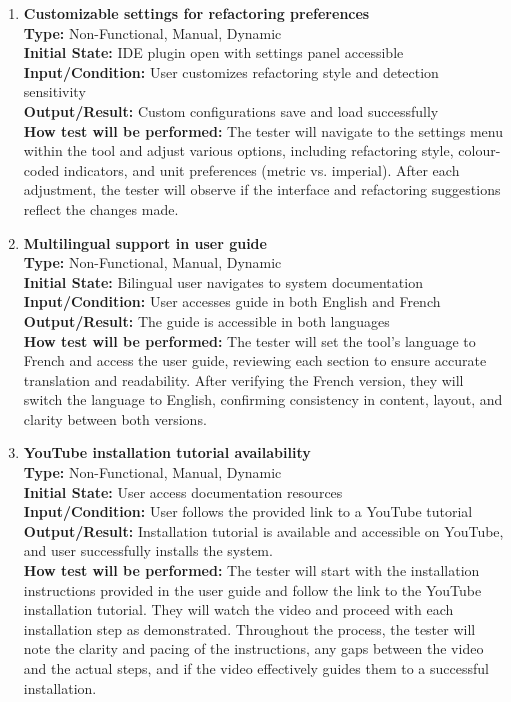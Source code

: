 \documentclass[12pt, titlepage]{article}
\begin{document}
\begin{enumerate}[label={\bf \textcolor{Maroon}{test-UH-\arabic*}}, wide=0pt, font=\itshape]
  \item \textbf{Customizable settings for refactoring preferences} \\[2mm]
    \textbf{Type:} Non-Functional, Manual, Dynamic \\
    \textbf{Initial State:} IDE plugin open with settings panel accessible \\
    \textbf{Input/Condition:} User customizes refactoring style and detection sensitivity \\
    \textbf{Output/Result:} Custom configurations save and load successfully \\[2mm]
    \textbf{How test will be performed:} The tester will navigate to the settings menu within the tool and adjust various options, including refactoring style, colour-coded indicators, and unit preferences (metric vs. imperial). After each adjustment, the tester will observe if the interface and refactoring suggestions reflect the changes made. 

  \item \textbf{Multilingual support in user guide} \\[2mm]
    \textbf{Type:} Non-Functional, Manual, Dynamic \\ 
    \textbf{Initial State:} Bilingual user navigates to system documentation \\
    \textbf{Input/Condition:} User accesses guide in both English and French \\
    \textbf{Output/Result:} The guide is accessible in both languages \\[2mm]
    \textbf{How test will be performed:} The tester will set the tool’s language to French and access the user guide, reviewing each section to ensure accurate translation and readability. After verifying the French version, they will switch the language to English, confirming consistency in content, layout, and clarity between both versions.

  \item \textbf{YouTube installation tutorial availability} \\[2mm]
    \textbf{Type:} Non-Functional, Manual, Dynamic \\ 
    \textbf{Initial State:} User access documentation resources \\
    \textbf{Input/Condition:} User follows the provided link to a YouTube tutorial \\
    \textbf{Output/Result:} Installation tutorial is available and accessible on YouTube, and user successfully installs the system. \\[2mm]
    \textbf{How test will be performed:} The tester will start with the installation instructions provided in the user guide and follow the link to the YouTube installation tutorial. They will watch the video and proceed with each installation step as demonstrated. Throughout the process, the tester will note the clarity and pacing of the instructions, any gaps between the video and the actual steps, and if the video effectively guides them to a successful installation. 


\end{enumerate}
\end{document}
